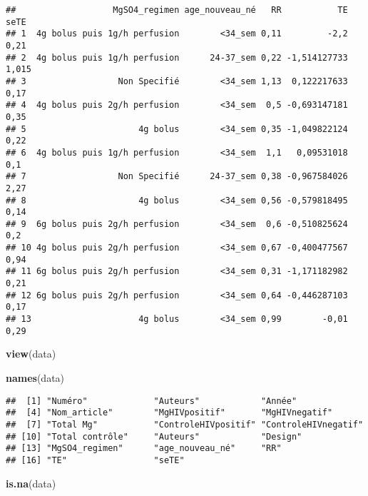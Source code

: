 \documentclass[
]{article}
\newenvironment{Shaded}{\begin{snugshade}}{\end{snugshade}}
\newcommand{\FunctionTok}[1]{\textcolor[rgb]{0.13,0.29,0.53}{\textbf{#1}}}
\newcommand{\NormalTok}[1]{#1}
\begin{document}
\begin{verbatim}
##                   MgSO4_regimen age_nouveau_né   RR           TE  seTE
## 1  4g bolus puis 1g/h perfusion        <34_sem 0,11         -2,2  0,21
## 2  4g bolus puis 1g/h perfusion      24-37_sem 0,22 -1,514127733 1,015
## 3                  Non Specifié        <34_sem 1,13  0,122217633  0,17
## 4  4g bolus puis 2g/h perfusion        <34_sem  0,5 -0,693147181  0,35
## 5                      4g bolus        <34_sem 0,35 -1,049822124  0,22
## 6  4g bolus puis 1g/h perfusion        <34_sem  1,1   0,09531018   0,1
## 7                  Non Specifié      24-37_sem 0,38 -0,967584026  2,27
## 8                      4g bolus        <34_sem 0,56 -0,579818495  0,14
## 9  6g bolus puis 2g/h perfusion        <34_sem  0,6 -0,510825624   0,2
## 10 4g bolus puis 2g/h perfusion        <34_sem 0,67 -0,400477567  0,94
## 11 6g bolus puis 2g/h perfusion        <34_sem 0,31 -1,171182982  0,21
## 12 6g bolus puis 2g/h perfusion        <34_sem 0,64 -0,446287103  0,17
## 13                     4g bolus        <34_sem 0,99        -0,01  0,29
\end{verbatim}

\begin{Shaded}
\begin{Highlighting}[]
\FunctionTok{view}\NormalTok{(data)}
\end{Highlighting}
\end{Shaded}

\begin{Shaded}
\begin{Highlighting}[]
\FunctionTok{names}\NormalTok{(data)}
\end{Highlighting}
\end{Shaded}

\begin{verbatim}
##  [1] "Numéro"             "Auteurs"            "Année"             
##  [4] "Nom_article"        "MgHIVpositif"       "MgHIVnegatif"      
##  [7] "Total Mg"           "ControleHIVpositif" "ControleHIVnegatif"
## [10] "Total contrôle"     "Auteurs"            "Design"            
## [13] "MgSO4_regimen"      "age_nouveau_né"     "RR"                
## [16] "TE"                 "seTE"
\end{verbatim}

\begin{Shaded}
\begin{Highlighting}[]
\FunctionTok{is.na}\NormalTok{(data)}
\end{Highlighting}
\end{Shaded}
\end{document}
